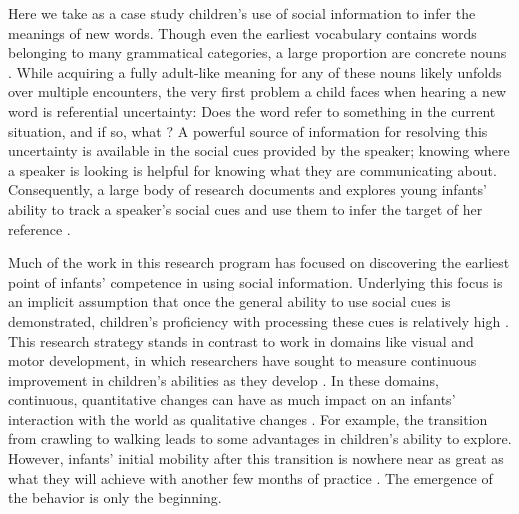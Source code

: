 \documentclass{pnastwo}
\begin{document}
\begin{article}



Here we take as a case study children's use of social information to infer the meanings of new words. Though even the earliest vocabulary contains words belonging to many grammatical categories, a large proportion are concrete nouns \citep{bates1994}. While acquiring a fully adult-like meaning for any of these nouns likely unfolds over multiple encounters, the very first problem a child faces when hearing a new word is referential uncertainty: Does the word refer to something in the current situation, and if so, what \citep{carey1978, yu2007, frank2009}? A powerful source of information for resolving this uncertainty is available in the social cues provided by the speaker; knowing where a speaker is looking is helpful for knowing what they are communicating about. Consequently, a large body of research documents and explores young infants' ability to track a speaker's social cues and use them to infer the target of her reference \citep[e.g.,][]{scaife1975, baldwin1993, hollich2000, senju2008}.

Much of the work in this research program has focused on discovering the earliest point of infants' competence in using social information. Underlying this focus is an implicit assumption that once the general ability to use social cues is demonstrated, children's proficiency with processing these cues is relatively high \citep[e.g.][]{corkum1998, brooks2005, csibra2009}. This research strategy stands in contrast to work in domains like visual and motor development, in which researchers have sought to measure continuous improvement in children's abilities as they develop \citep{sokol1978, banks1980, forssberg1991, thelen1995}. In these domains, continuous, quantitative changes can have as much impact on an infants' interaction with the world as qualitative changes \cite{adolph2015}. For example, the transition from crawling to walking leads to some advantages in children's ability to explore. However, infants' initial mobility after this transition is nowhere near as great as what they will achieve with another few months of practice \cite{adolph2012}. The emergence of the behavior is only the beginning.


\end{article}
\end{document}
